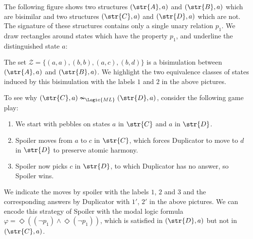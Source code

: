 \begin{example}
  The following figure shows two structures $(\str{A}, {a})$ and $(\str{B}, {a})$ which are bisimilar and two structures $(\str{C}, {a})$ and $(\str{D}, {a})$ which are not.
  The signature of these structures contains only a single unary relation $p_{1}$.
  We draw rectangles around states which have the property $p_{1}$, and underline the distinguished state $a$:

  \vspace{1em}
  
  \vspace{-1em}

  \noindent
  The set $\mathcal{Z} = \{(a,a), (b,b), (a,c), (b,d) \}$ is a bisimulation between $(\str{A}, {a})$ and $(\str{B}, {a})$.
  We highlight the two equivalence classes of states induced by this bisimulation with the labels $1$ and $2$ in the above pictures.

  \noindent
  To see why $(\str{C}, {a}) \nsim_{\Logic{ML}} (\str{D}, {a})$, consider the following game play:
  \begin{enumerate}
    \item We start with pebbles on states ${a}$ in $\str{C}$ and ${a}$ in $\str{D}$.
    \item Spoiler moves from ${a}$ to $c$ in $\str{C}$, which forces Duplicator to move to $d$ in $\str{D}$ to preserve atomic harmony.
    \item Spoiler now picks $c$ in $\str{D}$, to which Duplicator has no answer, so Spoiler wins.
  \end{enumerate}
  We indicate the moves by spoiler with the labels $1$, $2$ and $3$ and the corresponding answers by Duplicator with $1'$, $2'$ in the above pictures.
  We can encode this strategy of Spoiler with the modal logic formula $\varphi = \Diamond((\neg p_{1}) \land \Diamond (\neg p_{1}))$, which is satisfied in $(\str{D}, {a})$ but not in $(\str{C}, {a})$.
\end{example}

